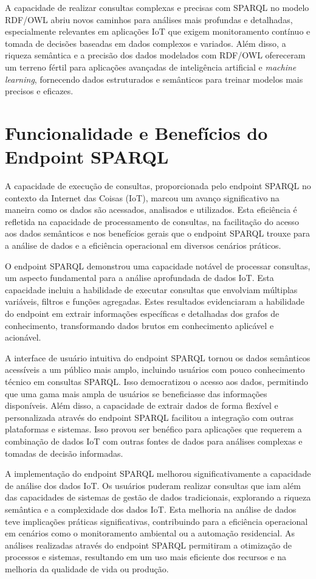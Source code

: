 A capacidade de realizar consultas complexas e precisas com SPARQL no modelo RDF/OWL abriu novos caminhos para análises mais profundas e detalhadas, especialmente relevantes em aplicações IoT que exigem monitoramento contínuo e tomada de decisões baseadas em dados complexos e variados. Além disso, a riqueza semântica e a precisão dos dados modelados com RDF/OWL ofereceram um terreno fértil para aplicações avançadas de inteligência artificial e \textit{machine learning}, fornecendo dados estruturados e semânticos para treinar modelos mais precisos e eficazes.

\section{Funcionalidade e Benefícios do Endpoint SPARQL}

A capacidade de execução de consultas, proporcionada pelo endpoint SPARQL no contexto da Internet das Coisas (IoT), marcou um avanço significativo na maneira como os dados são acessados, analisados e utilizados. Esta eficiência é refletida na capacidade de processamento de consultas, na facilitação do acesso aos dados semânticos e nos benefícios gerais que o endpoint SPARQL trouxe para a análise de dados e a eficiência operacional em diversos cenários práticos.

O endpoint SPARQL demonstrou uma capacidade notável de processar consultas, um aspecto fundamental para a análise aprofundada de dados IoT. Esta capacidade incluiu a habilidade de executar consultas que envolviam múltiplas variáveis, filtros e funções agregadas. Estes resultados evidenciaram a habilidade do endpoint em extrair informações específicas e detalhadas dos grafos de conhecimento, transformando dados brutos em conhecimento aplicável e acionável.

A interface de usuário intuitiva do endpoint SPARQL tornou os dados semânticos acessíveis a um público mais amplo, incluindo usuários com pouco conhecimento técnico em consultas SPARQL. Isso democratizou o acesso aos dados, permitindo que uma gama mais ampla de usuários se beneficiasse das informações disponíveis. Além disso, a capacidade de extrair dados de forma flexível e personalizada através do endpoint SPARQL facilitou a integração com outras plataformas e sistemas. Isso provou ser benéfico para aplicações que requerem a combinação de dados IoT com outras fontes de dados para análises complexas e tomadas de decisão informadas.

A implementação do endpoint SPARQL melhorou significativamente a capacidade de análise dos dados IoT. Os usuários puderam realizar consultas que iam além das capacidades de sistemas de gestão de dados tradicionais, explorando a riqueza semântica e a complexidade dos dados IoT. Esta melhoria na análise de dados teve implicações práticas significativas, contribuindo para a eficiência operacional em cenários como o monitoramento ambiental ou a automação residencial. As análises realizadas através do endpoint SPARQL permitiram a otimização de processos e sistemas, resultando em um uso mais eficiente dos recursos e na melhoria da qualidade de vida ou produção.

